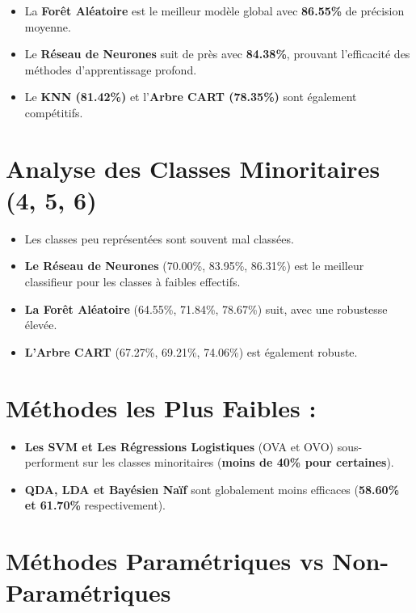 \documentclass[
]{article}
\providecommand{\tightlist}{%
  \setlength{\itemsep}{0pt}\setlength{\parskip}{0pt}}\usepackage{longtable,booktabs,array}
\begin{document}
\begin{itemize}
\tightlist
\item
  La \textbf{Forêt Aléatoire} est le meilleur modèle global avec
  \textbf{86.55\%} de précision moyenne.
\item
  Le \textbf{Réseau de Neurones} suit de près avec \textbf{84.38\%},
  prouvant l'efficacité des méthodes d'apprentissage profond.
\item
  Le \textbf{KNN (81.42\%)} et l'\textbf{Arbre CART (78.35\%)} sont
  également compétitifs.
\end{itemize}

\section{Analyse des Classes Minoritaires (4, 5,
6)}\label{analyse-des-classes-minoritaires-4-5-6}

\begin{itemize}
\tightlist
\item
  Les classes peu représentées sont souvent mal classées.
\item
  \textbf{Le Réseau de Neurones} (70.00\%, 83.95\%, 86.31\%) est le
  meilleur classifieur pour les classes à faibles effectifs.
\item
  \textbf{La Forêt Aléatoire} (64.55\%, 71.84\%, 78.67\%) suit, avec une
  robustesse élevée.
\item
  \textbf{L'Arbre CART} (67.27\%, 69.21\%, 74.06\%) est également
  robuste.
\end{itemize}

\section{Méthodes les Plus Faibles
:}\label{muxe9thodes-les-plus-faibles}

\begin{itemize}
\tightlist
\item
  \textbf{Les SVM et Les Régressions Logistiques} (OVA et OVO)
  sous-performent sur les classes minoritaires (\textbf{moins de 40\%
  pour certaines}).
\item
  \textbf{QDA, LDA et Bayésien Naïf} sont globalement moins efficaces
  (\textbf{58.60\% et 61.70\%} respectivement).
\end{itemize}

\section{Méthodes Paramétriques vs
Non-Paramétriques}\label{muxe9thodes-paramuxe9triques-vs-non-paramuxe9triques}
\end{document}
